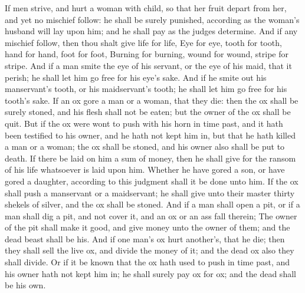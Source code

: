 \begin{biblechapter}
\verse If men strive, and hurt a woman with child, so that her fruit depart from her, and yet no mischief follow: he shall be surely punished, according as the woman's husband will lay upon him; and he shall pay as the judges determine.
\verse And if any mischief follow, then thou shalt give life for life,
\verse Eye for eye, tooth for tooth, hand for hand, foot for foot,
\verse Burning for burning, wound for wound, stripe for stripe.
\verse And if a man smite the eye of his servant, or the eye of his maid, that it perish; he shall let him go free for his eye's sake.
\verse And if he smite out his manservant's tooth, or his maidservant's tooth; he shall let him go free for his tooth's sake.
\verse If an ox gore a man or a woman, that they die: then the ox shall be surely stoned, and his flesh shall not be eaten; but the owner of the ox shall be quit.
\verse But if the ox were wont to push with his horn in time past, and it hath been testified to his owner, and he hath not kept him in, but that he hath killed a man or a woman; the ox shall be stoned, and his owner also shall be put to death.
\verse If there be laid on him a sum of money, then he shall give for the ransom of his life whatsoever is laid upon him.
\verse Whether he have gored a son, or have gored a daughter, according to this judgment shall it be done unto him.
\verse If the ox shall push a manservant or a maidservant; he shall give unto their master thirty shekels of silver, and the ox shall be stoned.
\verse And if a man shall open a pit, or if a man shall dig a pit, and not cover it, and an ox or an ass fall therein;
\verse The owner of the pit shall make it good, and give money unto the owner of them; and the dead beast shall be his.
\verse And if one man's ox hurt another's, that he die; then they shall sell the live ox, and divide the money of it; and the dead ox also they shall divide.
\verse Or if it be known that the ox hath used to push in time past, and his owner hath not kept him in; he shall surely pay ox for ox; and the dead shall be his own.
\end{biblechapter}

